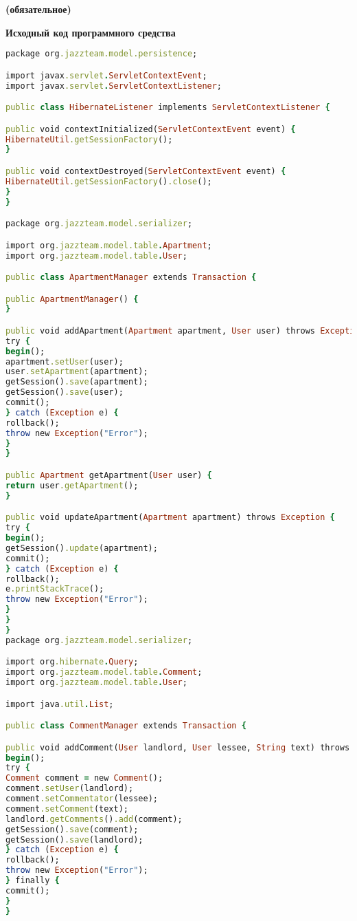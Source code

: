 

\begin{center}
\vspace{-1em}
\textbf{ (обязательное)}

\textbf{Исходный код программного средства}
\end{center}


  \begin{lstlisting}[language=Ruby, style=rubystyle]
package org.jazzteam.model.persistence;

import javax.servlet.ServletContextEvent;
import javax.servlet.ServletContextListener;

public class HibernateListener implements ServletContextListener {

public void contextInitialized(ServletContextEvent event) {
HibernateUtil.getSessionFactory();
}

public void contextDestroyed(ServletContextEvent event) {
HibernateUtil.getSessionFactory().close();
}
}

package org.jazzteam.model.serializer;

import org.jazzteam.model.table.Apartment;
import org.jazzteam.model.table.User;

public class ApartmentManager extends Transaction {

public ApartmentManager() {
}

public void addApartment(Apartment apartment, User user) throws Exception {
try {
begin();
apartment.setUser(user);
user.setApartment(apartment);
getSession().save(apartment);
getSession().save(user);
commit();
} catch (Exception e) {
rollback();
throw new Exception("Error");
}
}

public Apartment getApartment(User user) {
return user.getApartment();
}

public void updateApartment(Apartment apartment) throws Exception {
try {
begin();
getSession().update(apartment);
commit();
} catch (Exception e) {
rollback();
e.printStackTrace();
throw new Exception("Error");
}
}
}
package org.jazzteam.model.serializer;

import org.hibernate.Query;
import org.jazzteam.model.table.Comment;
import org.jazzteam.model.table.User;

import java.util.List;

public class CommentManager extends Transaction {

public void addComment(User landlord, User lessee, String text) throws Exception {
begin();
try {
Comment comment = new Comment();
comment.setUser(landlord);
comment.setCommentator(lessee);
comment.setComment(text);
landlord.getComments().add(comment);
getSession().save(comment);
getSession().save(landlord);
} catch (Exception e) {
rollback();
throw new Exception("Error");
} finally {
commit();
}
}


\end{lstlisting}

